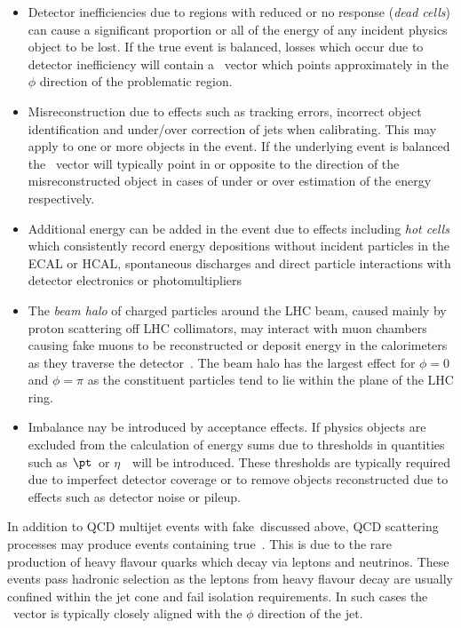\begin{itemize}
\item Detector inefficiencies due to regions with reduced or no response (\emph{dead cells}) can cause 
a significant proportion or all of the energy of any incident physics object to be lost. If the true event 
is balanced, losses which occur due to detector inefficiency will contain a \met~vector which points 
approximately in the $\phi$ direction of the problematic region.
\item Misreconstruction due to effects such as tracking errors, incorrect object identification and
under/over correction of jets when calibrating. This may apply to one or more objects in the event. If the 
underlying event is balanced the \met~vector will typically point in or opposite to the direction 
of the misreconstructed object in cases of under or over estimation of the energy respectively.
\item Additional energy can be added in the event due to effects including \emph{hot cells} which 
consistently record energy depositions without incident particles in the ECAL or HCAL, 
spontaneous discharges and direct particle interactions with detector
electronics or photomultipliers
\item The \emph{beam halo} of charged particles around the LHC beam, caused mainly 
by proton scattering off LHC collimators, 
may interact with muon chambers causing fake muons to be reconstructed or deposit energy 
in the calorimeters as they traverse the detector~\cite{beam_halo}. The beam halo has the largest 
effect for $\phi = 0$ and $\phi=\pi$ as the constituent particles
tend to lie within the plane of the LHC ring.
\item Imbalance nay be introduced by acceptance effects. If physics objects are excluded from the calculation
of energy sums due to thresholds in quantities such as $\pt$~or $\eta$~\met~will be introduced. These thresholds are typically 
required due to imperfect detector coverage or to remove objects reconstructed due to effects such as detector 
noise or pileup.
\end{itemize}
In addition to QCD multijet events with fake~\met discussed above, QCD scattering processes 
may produce events containing true~\met. This is due to the rare production of heavy flavour 
quarks which decay via leptons and neutrinos. These events pass hadronic selection as the leptons from 
heavy flavour decay are usually confined within the jet cone and fail isolation requirements. 
In such cases the \met~vector is typically closely aligned with the $\phi$ direction of the jet.

